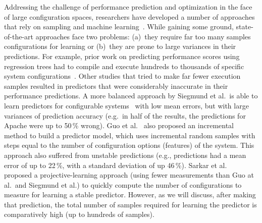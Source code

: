 \documentclass{sig-alternative}
\begin{document}
Addressing the challenge of performance prediction and optimization in the face of large configuration spaces, researchers have developed a number of approaches that rely on sampling and machine learning~\cite{siegmund2012predicting,guo2013variability,sarkar2015cost}. While gaining some ground, state-of-the-art approaches face two problems: 
(a)~they require far too many samples configurations for learning or (b)~they are prone to large variances in their predictions. For example, prior work on predicting performance scores using regression trees had to compile and execute hundreds to thousands of specific system configurations~\cite{guo2013variability}. 
Other studies that tried to make far fewer execution samples resulted in predictors that were considerably inaccurate in their performance predictions.
A more balanced approach by Siegmund et al.\ is able to learn predictors for  configurable systems~\cite{siegmund2012predicting} with low mean errors, but with large variances of prediction accuracy  (e.g.\ in half of the results, the predictions for  Apache  were up to 50\,\% wrong). 
Guo et al.~\cite{guo2013variability} also proposed an incremental method to build a predictor model, which uses incremental random samples with steps equal to the number of configuration options (features) of the system. This approach also
suffered from  unstable predictions (e.g., predictions had a mean error of up to 22\,\%, with a standard deviation of up 46\,\%). Sarkar et al.~\cite{sarkar2015cost} proposed a proj\-ective-learning approach (using fewer measurements than Guo at al.\ and Siegmund et al.) to quickly compute  the number of configurations to measure for learning a stable predictor. However, as we will discuss, after making that prediction, the total number of samples required for learning the predictor is comparatively high (up to hundreds of samples).
\end{document}
